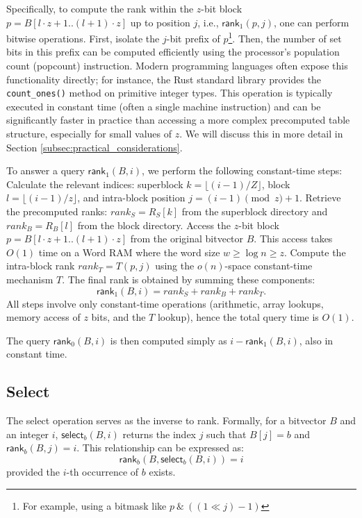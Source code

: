 Specifically, to compute the rank within the $z$-bit block $p = B[l \cdot z + 1 .. (l+1) \cdot z]$ up to position $j$, i.e., $\textsf{rank}_1(p, j)$, one can perform bitwise operations. First, isolate the $j$-bit prefix of $p$\footnote{For example, using a bitmask like $p \ \& \ ((1 \ll j) - 1)$}. Then, the number of set bits in this prefix can be computed efficiently using the processor's population count (popcount) instruction. Modern programming languages often expose this functionality directly; for instance, the Rust standard library provides the \texttt{count\_ones()} method on primitive integer types. This operation is typically executed in constant time (often a single machine instruction) and can be significantly faster in practice than accessing a more complex precomputed table structure, especially for small values of $z$.  We will discuss this in more detail in Section \ref{subsec:practical_considerations}.

To answer a query $\textsf{rank}_1(B, i)$, we perform the following constant-time steps:
Calculate the relevant indices: superblock $k = \lfloor (i-1)/Z \rfloor$, block $l = \lfloor (i-1)/z \rfloor$, and intra-block position $j = (i-1) \pmod z + 1$.
Retrieve the precomputed ranks: $rank_S = R_S[k]$ from the superblock directory and $rank_B = R_B[l]$ from the block directory.
Access the $z$-bit block $p = B[l \cdot z + 1 .. (l+1) \cdot z]$ from the original bitvector $B$. This access takes $O(1)$ time on a Word RAM where the word size $w \ge \log n \ge z$.
Compute the intra-block rank $rank_T = T(p, j)$ using the $o(n)$-space constant-time mechanism $T$.
The final rank is obtained by summing these components:
\begin{equation*}
    \textsf{rank}_1(B, i) = rank_S + rank_B + rank_T.
\end{equation*}
All steps involve only constant-time operations (arithmetic, array lookups, memory access of $z$ bits, and the $T$ lookup), hence the total query time is $O(1)$.

The query $\textsf{rank}_0(B, i)$ is then computed simply as $i - \textsf{rank}_1(B, i)$, also in constant time.

\subsection{\textsf{Select}} \label{subsec:select}

The \textsf{select} operation serves as the inverse to \textsf{rank}. Formally, for a bitvector $B$ and an integer $i$, $\textsf{select}_b(B, i)$ returns the index $j$ such that $B[j] = b$ and $\textsf{rank}_b(B, j) = i$. This relationship can be expressed as:
\begin{equation*}
    \textsf{rank}_b(B, \textsf{select}_b(B, i)) = i
\end{equation*}
provided the $i$-th occurrence of $b$ exists.

